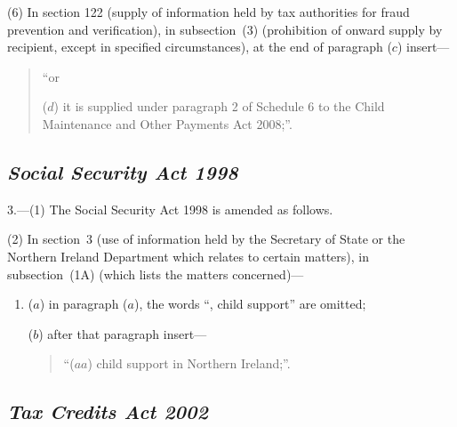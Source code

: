 \documentclass[12pt,a4paper]{article}
\begin{document}
(6) In section 122 (supply of information held by tax authorities for fraud prevention and verification), in subsection~(3) (prohibition of onward supply by recipient, except in specified circumstances), at the end of paragraph ($c$) insert---
\begin{quotation}
 “or

 ($d$) it is supplied under paragraph 2 of Schedule 6 to the Child Maintenance and Other Payments Act 2008;”.
\end{quotation}

\subsection*{\itshape Social Security Act 1998}

3.---(1) The Social Security Act 1998 is amended as follows.

(2) In section~3 (use of information held by the Secretary of State or the Northern Ireland Department which relates to certain matters), in subsection~(1A) (which lists the matters concerned)—
\begin{enumerate}\item[]
($a$) in paragraph ($a$), the words “, child support” are omitted;

($b$) after that paragraph insert—
\begin{quotation}
“($aa$) child support in Northern Ireland;”.
\end{quotation}
\end{enumerate}



\subsection*{\itshape Tax Credits Act 2002}
\end{document}
